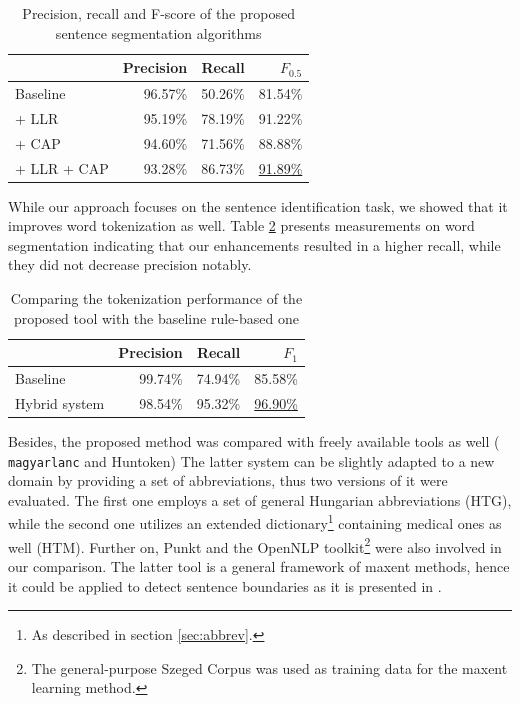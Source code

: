 \begin{table}[H]
\centering
\caption{Precision, recall and F-score of the proposed sentence segmentation algorithms}
\label{tab:prec_rec}
\begin{tabular}{ l r r  r  } 
\hline
& Precision & Recall & $F_{0.5}$ \\
\hline
Baseline & 96.57\% & 50.26\% & 81.54\%  \\
+ LLR & 95.19\% & 78.19\% & 91.22\% \\
+ CAP & 94.60\% & 71.56\% & 88.88\% \\
+ LLR + CAP & 93.28\% & 86.73\% & \underline{91.89\%} \\
\hline
\end{tabular}
\end{table}


While our approach focuses on the sentence identification task, we showed that it improves word tokenization as well. 
Table \ref{tab:tok_eval} presents measurements on word segmentation indicating that our enhancements resulted in a higher recall, while they did not decrease precision notably. \label{sec:eval}


\begin{table}[H]
\centering
\caption{Comparing the tokenization performance of the proposed tool with the baseline rule-based one}
\label{tab:tok_eval}
\begin{tabular}{ l r r r} 
\hline
& Precision & Recall & $F_{1}$ \\
\hline
Baseline & 99.74\% & 74.94\% & 85.58\%  \\
Hybrid system & 98.54\% & 95.32\% & \underline{96.90\%} \\
\hline
\end{tabular}
\end{table}

Besides, the proposed method was compared with freely available tools as well (
\texttt{magyarlanc} and Huntoken)
The latter system can be slightly adapted to a new domain by providing a set of abbreviations, thus two versions of it were evaluated. 
The first one employs a set of general Hungarian abbreviations (HTG), while the second one utilizes an extended dictionary\footnote{As described in section \ref{sec:abbrev}.} containing medical ones as well (HTM). 
Further on, Punkt \cite{kiss2006unsupervised} and the OpenNLP \cite{Baldridge2002} toolkit\footnote{The general-purpose Szeged Corpus was used as training data for the \acrlong{maxent} learning method.} were also involved in our comparison. 
The latter tool is a general framework of \acrlong{maxent} methods, hence it could be applied to detect sentence boundaries as it is presented in \cite{reynar1997maximum}.


